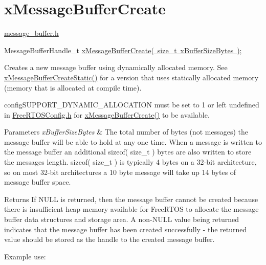 \hypertarget{group__x_message_buffer_create}{}\section{x\+Message\+Buffer\+Create}
\label{group__x_message_buffer_create}
\mbox{\hyperlink{message__buffer_8h}{message\+\_\+buffer.\+h}}


\begin{DoxyPre}
MessageBufferHandle\_t \mbox{\hyperlink{message__buffer_8h_a2959cd0e3d2bd20d46908e5c9872be36}{xMessageBufferCreate( size\_t xBufferSizeBytes )}};
\end{DoxyPre}


Creates a new message buffer using dynamically allocated memory. See \mbox{\hyperlink{message__buffer_8h_acc84f4a15dbd39ecbad35f7337e78b2c}{x\+Message\+Buffer\+Create\+Static()}} for a version that uses statically allocated memory (memory that is allocated at compile time).

config\+S\+U\+P\+P\+O\+R\+T\+\_\+\+D\+Y\+N\+A\+M\+I\+C\+\_\+\+A\+L\+L\+O\+C\+A\+T\+I\+ON must be set to 1 or left undefined in \mbox{\hyperlink{_free_r_t_o_s_config_8h}{Free\+R\+T\+O\+S\+Config.\+h}} for \mbox{\hyperlink{message__buffer_8h_a2959cd0e3d2bd20d46908e5c9872be36}{x\+Message\+Buffer\+Create()}} to be available.


\begin{DoxyParams}{Parameters}
{\em x\+Buffer\+Size\+Bytes} & The total number of bytes (not messages) the message buffer will be able to hold at any one time. When a message is written to the message buffer an additional sizeof( size\+\_\+t ) bytes are also written to store the message\textquotesingle{}s length. sizeof( size\+\_\+t ) is typically 4 bytes on a 32-\/bit architecture, so on most 32-\/bit architectures a 10 byte message will take up 14 bytes of message buffer space.\\
\hline
\end{DoxyParams}
\begin{DoxyReturn}{Returns}
If N\+U\+LL is returned, then the message buffer cannot be created because there is insufficient heap memory available for Free\+R\+T\+OS to allocate the message buffer data structures and storage area. A non-\/\+N\+U\+LL value being returned indicates that the message buffer has been created successfully -\/ the returned value should be stored as the handle to the created message buffer.
\end{DoxyReturn}
Example use\+: 
\begin{DoxyPre}\end{DoxyPre}



